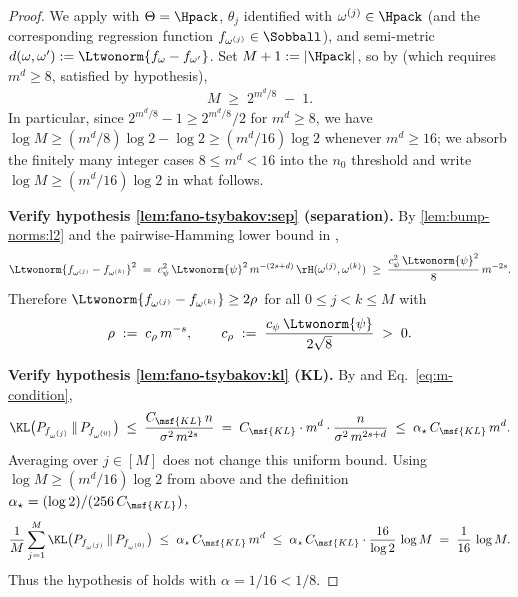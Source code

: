\begin{proof}
We apply  with $\Theta = \Hpack$, $\theta_j$ identified with $\omega^{(j)} \in \Hpack$ (and the corresponding regression function $f_{\omega^{(j)}} \in \Sobball$), and semi-metric $d(\omega, \omega') := \Ltwonorm{f_\omega - f_{\omega'}}$. Set $M+1 := |\Hpack|$, so by  (which requires $m^d \geq 8$, satisfied by hypothesis),
\begin{align}\label{eq:M-lb}
M \;\geq\; 2^{m^d / 8} \;-\; 1.
\end{align}
In particular, since $2^{m^d/8} - 1 \geq 2^{m^d/8}/2$ for $m^d \geq 8$, we have $\log M \geq (m^d / 8) \log 2 - \log 2 \geq (m^d / 16) \log 2$ whenever $m^d \geq 16$; we absorb the finitely many integer cases $8 \leq m^d < 16$ into the $n_0$ threshold and write $\log M \geq (m^d / 16) \log 2$ in what follows.

\smallskip\noindent\textbf{Verify hypothesis \ref{lem:fano-tsybakov:sep} (separation).}
By \ref{lem:bump-norms:l2} and the pairwise-Hamming lower bound in ,
\begin{align}\label{eq:sep-direct}
\Ltwonorm{f_{\omega^{(j)}} - f_{\omega^{(k)}}}^2
\;=\; c_\psi^2 \, \Ltwonorm{\psi}^2 \, m^{-(2s + d)} \, \rH(\omega^{(j)}, \omega^{(k)})
\;\geq\; \frac{c_\psi^2 \, \Ltwonorm{\psi}^2}{8} \, m^{-2s}.
\end{align}
Therefore $\Ltwonorm{f_{\omega^{(j)}} - f_{\omega^{(k)}}} \geq 2\rho$ for all $0 \leq j < k \leq M$ with
\begin{align}\label{eq:rho-def}
\rho \;:=\; c_\rho \, m^{-s},
\qquad
c_\rho \;:=\; \frac{c_\psi \, \Ltwonorm{\psi}}{2 \sqrt{8}} \;>\; 0.
\end{align}

\smallskip\noindent\textbf{Verify hypothesis \ref{lem:fano-tsybakov:kl} (KL).}
By  and Eq.~\eqref{eq:m-condition},
\begin{align*}
\KL\bigl(P_{f_{\omega^{(j)}}} \,\|\, P_{f_{\omega^{(0)}}}\bigr)
\;\leq\; \frac{C_{\msf{KL}} \, n}{\sigma^2 \, m^{2s}}
\;=\; C_{\msf{KL}} \cdot m^d \cdot \frac{n}{\sigma^2 \, m^{2s + d}}
\;\leq\; \alpha_\star \, C_{\msf{KL}} \, m^d.
\end{align*}
Averaging over $j \in [M]$ does not change this uniform bound. Using $\log M \geq (m^d / 16) \log 2$ from above and the definition $\alpha_\star = (\log 2) / (256 \, C_{\msf{KL}})$,
\begin{align}\label{eq:kl-alpha}
\frac{1}{M} \sum_{j=1}^M \KL\bigl(P_{f_{\omega^{(j)}}} \,\|\, P_{f_{\omega^{(0)}}}\bigr)
\;\leq\; \alpha_\star \, C_{\msf{KL}} \, m^d
\;\leq\; \alpha_\star \, C_{\msf{KL}} \cdot \frac{16}{\log 2} \, \log M
\;=\; \frac{1}{16} \, \log M.
\end{align}
Thus the hypothesis of  holds with $\alpha = 1/16 < 1/8$.


\end{proof}
